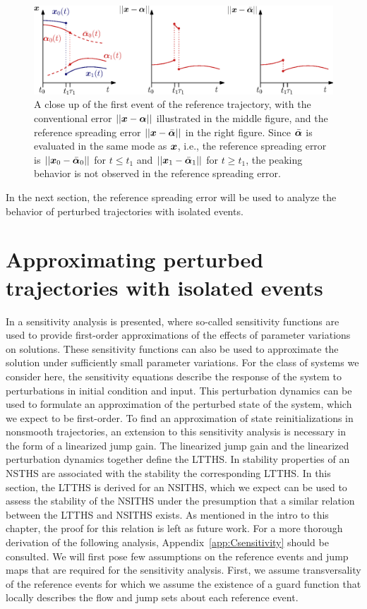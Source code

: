 \documentclass[../DC2019003Bouma.tex]{subfiles}
\begin{document}
\begin{figure}[bt!]
\centering
\includegraphics[width=\textwidth]{refspreaderrors.eps}\caption{A close up of the first event of the reference trajectory, with the conventional error $||{\boldsymbol{x}}-\boldsymbol{\alpha}||$ illustrated in the middle figure, and the reference spreading error $||{\boldsymbol{x}}-\bar{\boldsymbol{\alpha}}||$ in the right figure. Since $\bar{\boldsymbol{\alpha}}$ is evaluated in the same mode as ${\boldsymbol{x}}$, i.e., the reference spreading error is $||{\boldsymbol{x}}_0 - \bar{\boldsymbol{\alpha}}_0||$ for $t\leq t_1$ and $||{\boldsymbol{x}}_1 - \bar{\boldsymbol{\alpha}}_1||$ for $t\geq t_1$, the peaking behavior is not observed in the reference spreading error.}\label{fig:3refspreaderrors}
\end{figure}

In the next section, the reference spreading error will be used to analyze the behavior of perturbed trajectories with isolated events.

\section{Approximating perturbed trajectories with isolated events}\label{sec:3approx}
In \cite{Khalil1996} a sensitivity analysis is presented, where so-called sensitivity functions are used to provide first-order approximations of the effects of parameter variations on solutions. These sensitivity functions can also be used to approximate the solution under sufficiently small parameter variations. For the class of systems we consider here, the sensitivity equations describe the response of the system to perturbations in initial condition and input. This perturbation dynamics can be used to formulate an approximation of the perturbed state of the system, which we expect to be first-order. To find an approximation of state reinitializations in nonsmooth trajectories, an extension to this sensitivity analysis is necessary in the form of a linearized jump gain. The linearized jump gain and the linearized perturbation dynamics together define the LTTHS. In \cite{Rijnen2017} stability properties of an NSTHS are associated with the stability the corresponding LTTHS. In this section, the LTTHS is derived for an NSITHS, which we expect can be used to assess the stability of the NSITHS under the presumption that a similar relation between the LTTHS and NSITHS exists. As mentioned in the intro to this chapter, the proof for this relation is left as future work. For a more thorough derivation of the following analysis, Appendix~\ref{app:Csensitivity} should be consulted. We will first pose few assumptions on the reference events and jump maps that are required for the sensitivity analysis. First, we assume transversality of the reference events for which we assume the existence of a guard function that locally describes the flow and jump sets about each reference event.
\end{document}
